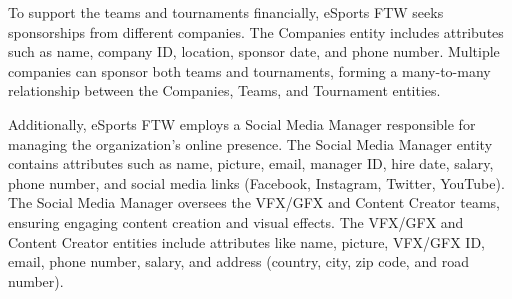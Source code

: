 To support the teams and tournaments financially, eSports FTW seeks sponsorships from different companies. The Companies entity includes attributes such as name, company ID, location, sponsor date, and phone number. Multiple companies can sponsor both teams and tournaments, forming a many-to-many relationship between the Companies, Teams, and Tournament entities.

Additionally, eSports FTW employs a Social Media Manager responsible for managing the organization's online presence. The Social Media Manager entity contains attributes such as name, picture, email, manager ID, hire date, salary, phone number, and social media links (Facebook, Instagram, Twitter, YouTube). The Social Media Manager oversees the VFX/GFX and Content Creator teams, ensuring engaging content creation and visual effects. The VFX/GFX and Content Creator entities include attributes like name, picture, VFX/GFX ID, email, phone number, salary, and address (country, city, zip code, and road number).
